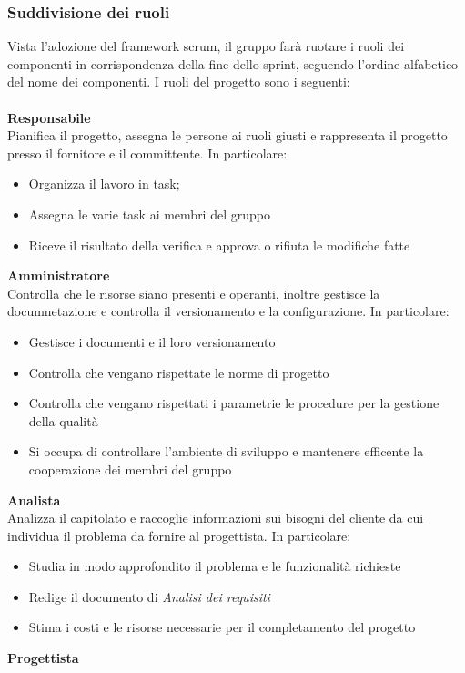 \documentclass[12pt]{article}
\begin{document}
\subsubsection{Suddivisione dei ruoli}
Vista l'adozione del framework scrum, il gruppo farà ruotare i ruoli dei componenti in corrispondenza della fine dello sprint, seguendo l'ordine alfabetico del nome dei componenti.
I ruoli del progetto sono i seguenti:\\\\
\textbf{Responsabile}\\
Pianifica il progetto, assegna le persone ai ruoli giusti e rappresenta il progetto presso il fornitore e il committente. In particolare:
\begin{itemize}
    \item Organizza il lavoro in task;
    \item Assegna le varie task ai membri del gruppo 
    \item Riceve il risultato della verifica e approva o rifiuta le modifiche fatte
\end{itemize}
\textbf{Amministratore}\\
Controlla che le risorse siano presenti e operanti, inoltre gestisce la documnetazione e controlla il versionamento e la configurazione. In particolare:
\begin{itemize}
    \item Gestisce i documenti e il loro versionamento
    \item Controlla che vengano rispettate le norme di progetto
    \item Controlla che vengano rispettati i parametrie le procedure per la gestione della qualità
    \item Si occupa di controllare l'ambiente di sviluppo e mantenere efficente la cooperazione dei membri del gruppo 
\end{itemize}
\textbf{Analista}\\
Analizza il capitolato e raccoglie informazioni sui bisogni del cliente da cui individua il problema da fornire al progettista. In particolare:
\begin{itemize}
    \item Studia in modo approfondito il problema e le funzionalità richieste
    \item Redige il documento di \textit{Analisi dei requisiti}
    \item Stima i costi e le risorse necessarie per il completamento del progetto
\end{itemize}
\textbf{Progettista}\\
\end{document}
